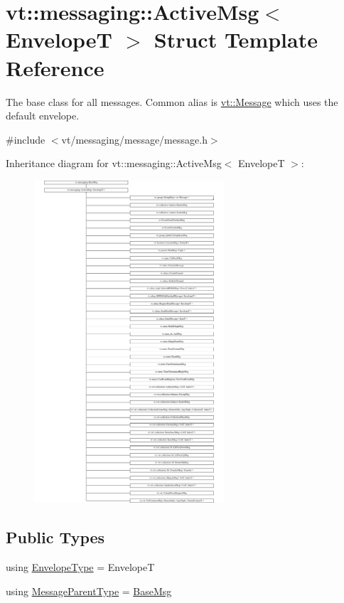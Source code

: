 \hypertarget{structvt_1_1messaging_1_1_active_msg}{}\section{vt\+:\+:messaging\+:\+:Active\+Msg$<$ EnvelopeT $>$ Struct Template Reference}
\label{structvt_1_1messaging_1_1_active_msg}


The base class for all messages. Common alias is {\ttfamily \hyperlink{namespacevt_a3a3ddfef40b4c90915fa43cdd5f129ea}{vt\+::\+Message}} which uses the default envelope.  




{\ttfamily \#include $<$vt/messaging/message/message.\+h$>$}

Inheritance diagram for vt\+:\+:messaging\+:\+:Active\+Msg$<$ EnvelopeT $>$\+:\begin{figure}[H]
\begin{center}
\leavevmode
\includegraphics[height=12.000000cm]{structvt_1_1messaging_1_1_active_msg}
\end{center}
\end{figure}
\subsection*{Public Types}
\begin{DoxyCompactItemize}
\item 
using \hyperlink{structvt_1_1messaging_1_1_active_msg_a6e2b0541c25f7290555bf50d7cc05874}{Envelope\+Type} = EnvelopeT
\item 
using \hyperlink{structvt_1_1messaging_1_1_active_msg_ac2e6d93267991027ce78c968b17064c7}{Message\+Parent\+Type} = \hyperlink{structvt_1_1messaging_1_1_base_msg}{Base\+Msg}
\end{DoxyCompactItemize}
